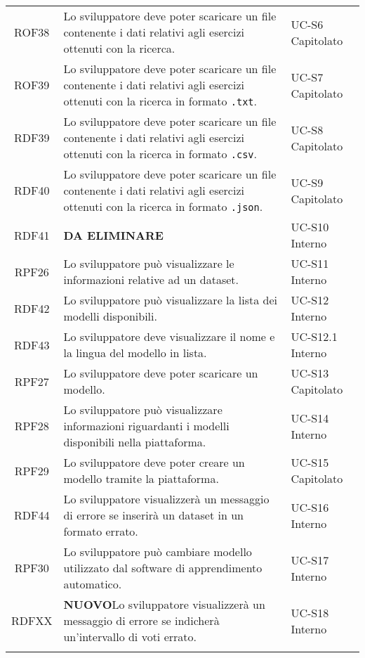 \begin{tabularx}{\textwidth}{| c | p{10cm} | X |}
		ROF38 & Lo sviluppatore deve poter scaricare un file contenente i dati relativi agli esercizi ottenuti con la ricerca. & UC-S6 \newline Capitolato\\
		ROF39 & Lo sviluppatore deve poter scaricare un file contenente i dati relativi agli esercizi ottenuti con la ricerca in formato \texttt{.txt}. & UC-S7 \newline Capitolato\\
		RDF39 & Lo sviluppatore deve poter scaricare un file contenente i dati relativi agli esercizi ottenuti con la ricerca in formato \texttt{.csv}. & UC-S8 \newline Capitolato\\
		RDF40 & Lo sviluppatore deve poter scaricare un file contenente i dati relativi agli esercizi ottenuti con la ricerca in formato \texttt{.json}. & UC-S9 \newline Capitolato\\
		RDF41 & \textbf{DA ELIMINARE} & UC-S10 \newline Interno\\		
		RPF26 & Lo sviluppatore può visualizzare le informazioni relative ad un dataset. & UC-S11 \newline Interno\\
		RDF42 & Lo sviluppatore può visualizzare la lista dei modelli disponibili. & UC-S12 \newline Interno\\
		RDF43 & Lo sviluppatore deve visualizzare il nome e la lingua del modello in lista. & UC-S12.1 \newline Interno\\
		RPF27 & Lo sviluppatore deve poter scaricare un modello. & UC-S13 \newline Capitolato\\
		RPF28 & Lo sviluppatore può visualizzare informazioni riguardanti i modelli disponibili nella piattaforma. & UC-S14 \newline Interno\\
		RPF29 & Lo sviluppatore deve poter creare un modello tramite la piattaforma. & UC-S15 \newline Capitolato\\ 
		RDF44 & Lo sviluppatore visualizzerà un messaggio di errore se inserirà un dataset in un formato errato. & UC-S16 \newline Interno\\
		RPF30 & Lo sviluppatore può cambiare modello utilizzato dal software di apprendimento automatico. & UC-S17 \newline Interno\\
		RDFXX & \textbf{NUOVO}Lo sviluppatore visualizzerà un messaggio di errore se indicherà un'intervallo di voti errato. & UC-S18 \newline Interno\\
		\hline
		\caption{Tabella dei requisiti funzionali}
\end{tabularx}

